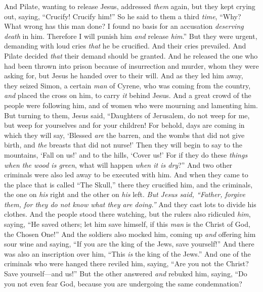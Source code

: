 \begin{biblechapter}
\verse And Pilate, wanting to release Jesus, addressed \textit{them}﻿ again,
\verse but they kept crying out, saying, “Crucify! Crucify him!”
\verse So he said to them a third \textit{time}, “Why? What wrong has this man done? I found no basis for an accusation \textit{deserving death} in him. Therefore I will punish him \textit{and} release \textit{him}.”
\verse But they were urgent, demanding with loud cries \textit{that} he be crucified. And their cries prevailed.
\verse And Pilate decided \textit{that} their demand should be granted.
\verse And he released the one who had been thrown into prison because of insurrection and murder, whom they were asking for, but Jesus he handed over to their will.
 And as they led him away, they seized Simon, a certain \textit{man} of Cyrene, who was coming from the country, \textit{and} placed the cross on him, to carry \textit{it} behind Jesus.
\verse And a great crowd of the people were following him, and of women who were mourning and lamenting him.
\verse But turning to them, Jesus said, “Daughters of Jerusalem, do not weep for me, but weep for yourselves and for your children!
\verse For behold, days are coming in which they will say, ‘Blessed \textit{are} the barren, and the wombs that did not give birth, and \textit{the} breasts that did not nurse!’
\verse Then they will begin to say to the mountains, ‘Fall on us!’ and to the hills, ‘Cover us!’
\verse For if they do these \textit{things} \textit{when the wood is green}, what will happen \textit{when it is dry}?”
\verse And two other criminals were also led away to be executed with him.
\verse And when they came to the place that is called “The Skull,” there they crucified him, and the criminals, the one on \textit{his} right and the other on \textit{his} left.
\verse \textit{But Jesus said, “Father, forgive them, for they do not know what they are doing.”} And they cast lots to divide his clothes.
\verse And the people stood there watching, but the rulers also ridiculed \textit{him}, saying, “He saved others; let him save himself, if this \textit{man} is the Christ of God, the Chosen One!”
\verse And the soldiers also mocked him, coming up \textit{and} offering him sour wine
\verse and saying, “If you are the king of the Jews, save yourself!”
\verse And there was also an inscription over him, “This \textit{is} the king of the Jews.”
\verse And one of the criminals who were hanged there reviled him, saying, “Are you not the Christ? Save yourself—and us!”
\verse But the other answered \textit{and} rebuked him, saying, “Do you not even fear God, because you are undergoing the same condemnation?

\end{biblechapter}

